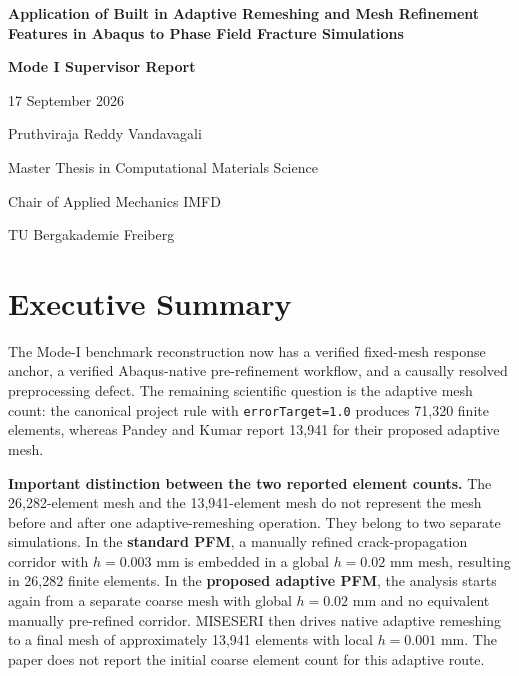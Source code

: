 \documentclass[10pt,a4paper]{article}
\begin{document}
\thispagestyle{empty}
\vspace*{25mm}
\begin{center}
{\fontsize{22}{27}\selectfont\bfseries Application of Built in Adaptive Remeshing and Mesh Refinement Features in Abaqus to Phase Field Fracture Simulations\par}
\vspace{12mm}
{\fontsize{18}{22}\selectfont\bfseries\color{navy}Mode I Supervisor Report\par}
\vspace{8mm}
{\large 17 September 2026\par}
\vfill
{\large Pruthviraja Reddy Vandavagali\par}
\vspace{2mm}
Master Thesis in Computational Materials Science\par
Chair of Applied Mechanics IMFD\par
TU Bergakademie Freiberg\par
\vspace{20mm}
\end{center}

\newpage
\section{Executive Summary}
The Mode-I benchmark reconstruction now has a verified fixed-mesh response anchor, a verified Abaqus-native pre-refinement workflow, and a causally resolved preprocessing defect. The remaining scientific question is the adaptive mesh count: the canonical project rule with \texttt{errorTarget=1.0} produces 71,320 finite elements, whereas Pandey and Kumar report 13,941 for their proposed adaptive mesh.

\textbf{Important distinction between the two reported element counts.} The 26,282-element mesh and the 13,941-element mesh do not represent the mesh before and after one adaptive-remeshing operation. They belong to two separate simulations. In the \textbf{standard PFM}, a manually refined crack-propagation corridor with $h=0.003$ mm is embedded in a global $h=0.02$ mm mesh, resulting in 26,282 finite elements. In the \textbf{proposed adaptive PFM}, the analysis starts again from a separate coarse mesh with global $h=0.02$ mm and no equivalent manually pre-refined corridor. MISESERI then drives native adaptive remeshing to a final mesh of approximately 13,941 elements with local $h=0.001$ mm. The paper does not report the initial coarse element count for this adaptive route.
\end{document}
